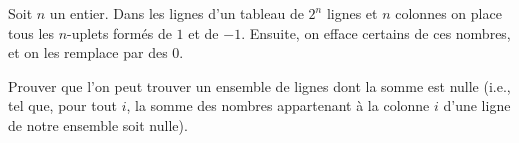 Soit $n$ un entier. Dans les lignes d'un tableau de $2^n$ lignes et $n$ colonnes on place tous les $n$-uplets formés de $1$ et de $-1$. Ensuite, on efface certains de ces nombres, et on les remplace par des $0$.

Prouver que l'on peut trouver un ensemble de lignes dont la somme est nulle (i.e., tel que, pour tout $i$, la somme des nombres appartenant \`a la colonne $i$ d'une ligne de notre ensemble soit nulle).
